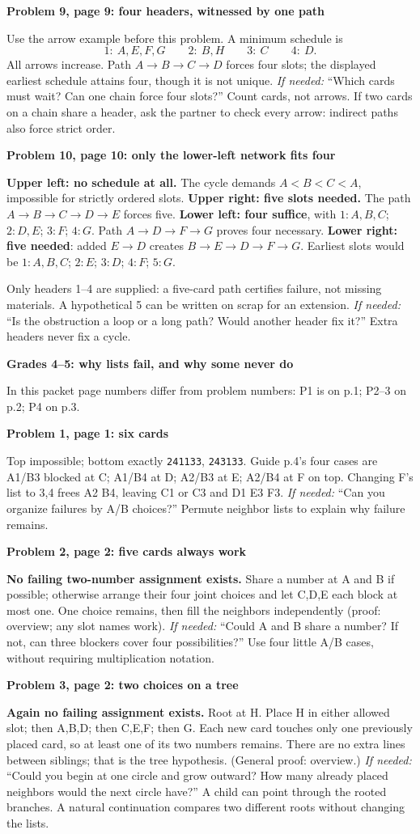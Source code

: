 \documentclass[10pt]{article}
\newcommand{\head}[1]{\par{\large\bfseries #1}\par}
\newcommand{\sub}[1]{\par\textbf{#1}\par}
\newcommand{\hint}[1]{\textit{If needed:} #1}
\newcommand{\word}[1]{\texttt{#1}}
\begin{document}
\sub{Problem 9, page 9: four headers, witnessed by one path}
Use the arrow example before this problem. A minimum schedule is
\[
1:\ A,E,F,G\qquad 2:\ B,H\qquad 3:\ C\qquad 4:\ D.
\]
All arrows increase. Path $A\to B\to C\to D$ forces four slots; the displayed earliest schedule attains four, though it is not unique. \hint{``Which cards must wait? Can one chain force four slots?''} Count cards, not arrows. If two cards on a chain share a header, ask the partner to check every arrow: indirect paths also force strict order.

\sub{Problem 10, page 10: only the lower-left network fits four}
\textbf{Upper left: no schedule at all.} The cycle demands $A<B<C<A$, impossible for strictly ordered slots. \textbf{Upper right: five slots needed.} The path $A\to B\to C\to D\to E$ forces five. \textbf{Lower left: four suffice}, with $1:A,B,C$; $2:D,E$; $3:F$; $4:G$. Path $A\to D\to F\to G$ proves four necessary. \textbf{Lower right: five needed}: added $E\to D$ creates $B\to E\to D\to F\to G$. Earliest slots would be $1:A,B,C$; $2:E$; $3:D$; $4:F$; $5:G$.

Only headers 1--4 are supplied: a five-card path certifies failure, not missing materials. A hypothetical 5 can be written on scrap for an extension. \hint{``Is the obstruction a loop or a long path? Would another header fix it?''} Extra headers never fix a cycle.

\newpage
\head{Grades 4--5: why lists fail, and why some never do}
In this packet page numbers differ from problem numbers: P1 is on p.1; P2--3 on p.2; P4 on p.3.

\sub{Problem 1, page 1: six cards}
Top impossible; bottom exactly \word{241133}, \word{243133}. Guide p.4's four cases are A1/B3 blocked at C; A1/B4 at D; A2/B3 at E; A2/B4 at F on top. Changing F's list to 3,4 frees A2 B4, leaving C1 or C3 and D1 E3 F3. \hint{``Can you organize failures by A/B choices?''} Permute neighbor lists to explain why failure remains.

\sub{Problem 2, page 2: five cards always work}
\textbf{No failing two-number assignment exists.} Share a number at A and B if possible; otherwise arrange their four joint choices and let C,D,E each block at most one. One choice remains, then fill the neighbors independently (proof: overview; any slot names work). \hint{``Could A and B share a number? If not, can three blockers cover four possibilities?''} Use four little A/B cases, without requiring multiplication notation.

\sub{Problem 3, page 2: two choices on a tree}
\textbf{Again no failing assignment exists.} Root at H. Place H in either allowed slot; then A,B,D; then C,E,F; then G. Each new card touches only one previously placed card, so at least one of its two numbers remains. There are no extra lines between siblings; that is the tree hypothesis. (General proof: overview.) \hint{``Could you begin at one circle and grow outward? How many already placed neighbors would the next circle have?''} A child can point through the rooted branches. A natural continuation compares two different roots without changing the lists.
\end{document}
